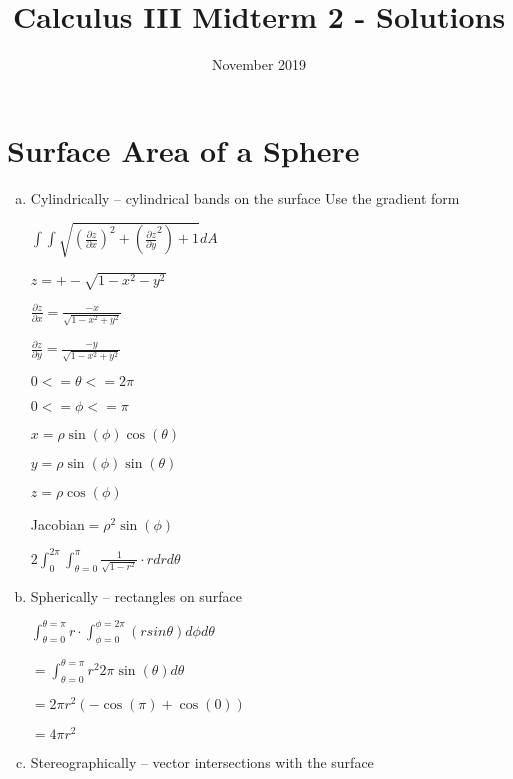 \documentclass{article}
\title{Calculus III Midterm 2 - Solutions}
\date{November 2019}
\begin{document}
\maketitle

\section{Surface Area of a Sphere}
\begin{enumerate}[a.]
	\item Cylindrically -- cylindrical bands on the surface
	    \newline \newline
        Use the gradient form

            $\int\int
                \sqrt{ (\frac{\partial z}{\partial x})^2 + (\frac{\partial z}{\partial y}^2) + 1 } dA$


            $z = +-\sqrt{1-x^{2}-y^{2}}$

            $\frac{\partial z}{\partial x} = \frac{-x}{\sqrt{1-x^2+y^2}}$

            $\frac{\partial z}{\partial y} = \frac{-y}{\sqrt{1-x^2+y^2}}$

            $0 <= \theta <= 2\pi $

            $0 <= \phi <= \pi $

            $x = \rho\sin(\phi)\cos(\theta) $

            $y = \rho\sin(\phi)\sin(\theta) $

            $z = \rho\cos(\phi) $

            Jacobian$ = \rho^2\sin(\phi) $

            $2\int_{0}^{2\pi}\int_{\theta=0}^{\pi} \frac{1}{\sqrt{1-r^2}}\cdot r dr d\theta$

	\item Spherically -- rectangles on surface

            $\int_{\theta=0}^{\theta=\pi}r\cdot\int_{\phi=0}^{\phi=2\pi} (r sin \theta) d\phi d\theta $

            $= \int_{\theta=0}^{\theta=\pi}r^2 2\pi \sin(\theta)d\theta $

            $=  2\pi r^2 (-\cos(\pi)+\cos(0)) $

            $= 4\pi r^2$

	\item Stereographically -- vector intersections with the surface
\end{enumerate}
\end{document}
